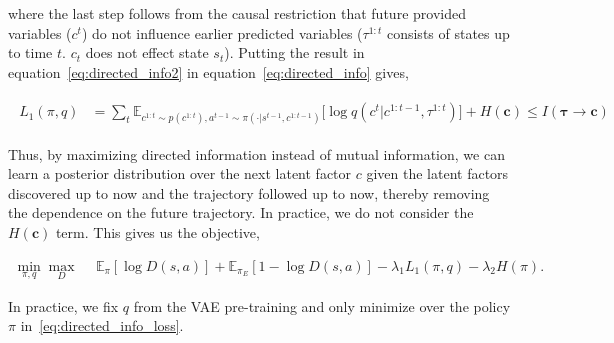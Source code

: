 \documentclass{article} %
\begin{document}
where the last step follows from the causal restriction that future provided variables ($c^t$) do not  influence earlier predicted variables ($\tau^{1:t}$ consists of states up to time $t$. $c_t$ does not effect state $s_t$). Putting the result in equation~\ref{eq:directed_info2} in equation~\ref{eq:directed_info} gives,

\begin{align}
\begin{split}
 L_{1}(\pi, q) &= \sum_{t} \mathbb{E}_{c^{1:t} \sim p(c^{1:t}), a^{t-1} \sim \pi(\cdot | s^{t-1},c^{1:t-1})} \Big[ \log q(c^{t} | c^{1:t-1}, \tau^{1:t}) \Big] + H(\boldsymbol{c}) \leq I(\boldsymbol{\tau} \rightarrow \boldsymbol{c})
\label{eq:loss2}
\end{split}
\end{align}

Thus, by maximizing directed information instead of mutual information, we can learn a posterior distribution over the next latent factor $c$ given the latent factors discovered up to now and the trajectory followed up to now, thereby removing the dependence on the future trajectory. In practice, we do not consider the $H(\boldsymbol{c})$ term. This gives us the objective,

\begin{align*}
    \min_{\pi, q} \max_{D} & ~~\mathbb{E}_{\pi} [\log D(s,a)] + \mathbb{E}_{\pi_E} [1-\log D(s,a)] -\lambda_{1}L_{1}(\pi, q) - \lambda_{2}H(\pi).
\end{align*}

In practice, we fix $q$ from the VAE pre-training and only minimize over the policy $\pi$ in~\eqref{eq:directed_info_loss}.

\begin{table}[]
\caption{Experiment settings for all the different environments for both DirectedInfo-GAIL and VAE-pretraining step respectively.}
\label{table:exp_settings}
\end{table}
\end{document}
